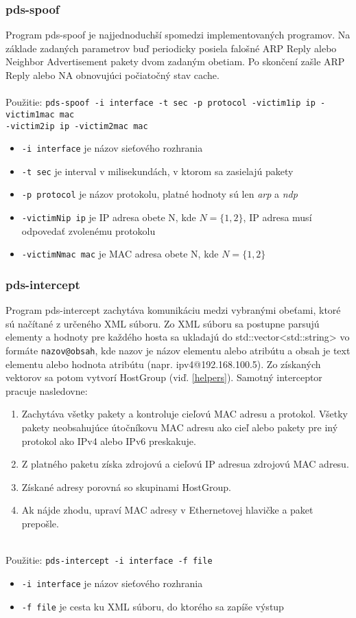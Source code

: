 \documentclass[a4paper,11pt]{article}
\begin{document}
\subsubsection{pds-spoof}
Program pds-spoof je najjednoduchší spomedzi implementovaných programov. Na základe zadaných parametrov buď periodicky posiela falošné ARP Reply alebo Neighbor Advertisement pakety dvom zadaným obetiam. Po skončení zašle ARP Reply alebo NA obnovujúci počiatočný stav cache.
\\ \\
Použitie: \texttt{pds-spoof -i interface -t sec -p protocol -victim1ip ip -victim1mac mac}\\ \texttt{-victim2ip ip -victim2mac mac}
\begin{itemize}
\item \texttt{-i interface} je názov sieťového rozhrania
\item \texttt{-t sec} je interval v milisekundách, v ktorom sa zasielajú pakety
\item \texttt{-p protocol} je názov protokolu, platné hodnoty sú len \textit{arp} a \textit{ndp}
\item \texttt{-victimNip ip} je IP adresa obete N, kde $N = \{1, 2\}$, IP adresa musí odpovedať zvolenému protokolu
\item \texttt{-victimNmac mac} je MAC adresa obete N, kde $N = \{1, 2\}$
\end{itemize}

\subsubsection{pds-intercept}
Program pds-intercept zachytáva komunikáciu medzi vybranými obeťami, ktoré sú načítané z určeného XML súboru. Zo XML súboru sa postupne parsujú elementy a hodnoty pre každého hosta sa ukladajú do std::vector<std::string> vo formáte \texttt{nazov@obsah}, kde nazov je názov elementu alebo atribútu a obsah je text elementu alebo hodnota atribútu (napr. ipv4@192.168.100.5). Zo získaných vektorov sa potom vytvorí HostGroup (viď. \ref{helpers}). Samotný interceptor pracuje nasledovne:
\begin{enumerate}
\item Zachytáva všetky pakety a kontroluje cieľovú MAC adresu a protokol. Všetky pakety neobsahujúce útočníkovu MAC adresu ako cieľ alebo pakety pre iný protokol ako IPv4 alebo IPv6 preskakuje.
\item Z platného paketu získa zdrojovú a cieľovú IP adresua zdrojovú MAC adresu.
\item Získané adresy porovná so skupinami HostGroup.
\item Ak nájde zhodu, upraví MAC adresy v Ethernetovej hlavičke a paket prepošle. 
\end{enumerate}
\ \\
Použitie: \texttt{pds-intercept -i interface -f file}
\begin{itemize}
\item \texttt{-i interface} je názov sieťového rozhrania
\item \texttt{-f file} je cesta ku XML súboru, do ktorého sa zapíše výstup
\end{itemize}
\end{document}
